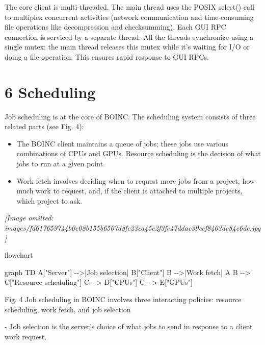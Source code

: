 \documentclass[
]{article}
\newenvironment{Shaded}{}{}
\newcommand{\NormalTok}[1]{#1}
\providecommand{\tightlist}{%
  \setlength{\itemsep}{0pt}\setlength{\parskip}{0pt}}
\begin{document}
The core client is multi-threaded. The main thread uses the POSIX
select() call to multiplex concurrent activities (network communication
and time-consuming file operations like decompression and checksumming).
Each GUI RPC connection is serviced by a separate thread. All the
threads synchronize using a single mutex; the main thread releases this
mutex while it's waiting for I/O or doing a file operation. This ensures
rapid response to GUI RPCs.

\section{6 Scheduling}\label{scheduling}

Job scheduling is at the core of BOINC. The scheduling system consists
of three related parts (see Fig. 4):

\begin{itemize}
\tightlist
\item
  The BOINC client maintains a queue of jobs; these jobs use various
  combinations of CPUs and GPUs. Resource scheduling is the decision of
  what jobs to run at a given point.\\
\item
  Work fetch involves deciding when to request more jobs from a project,
  how much work to request, and, if the client is attached to multiple
  projects, which project to ask.
\end{itemize}

\textit{[Image omitted: images/fd617659744b0c08b155b6567d8fc23ca45e2f3fe47ddac39cef8463dc84c6de.jpg]}

flowchart

\begin{Shaded}
\begin{Highlighting}[]
\NormalTok{graph TD}
\NormalTok{    A["Server"] {-}{-}\textgreater{}|Job selection| B["Client"]}
\NormalTok{    B {-}{-}\textgreater{}|Work fetch| A}
\NormalTok{    B {-}{-}\textgreater{} C["Resource scheduling"]}
\NormalTok{    C {-}{-}\textgreater{} D["CPUs"]}
\NormalTok{    C {-}{-}\textgreater{} E["GPUs"]}
\end{Highlighting}
\end{Shaded}

Fig. 4 Job scheduling in BOINC involves three interacting policies:
resource scheduling, work fetch, and job selection

- Job selection is the server's choice of what jobs to send in response
to a client work request.
\end{document}
